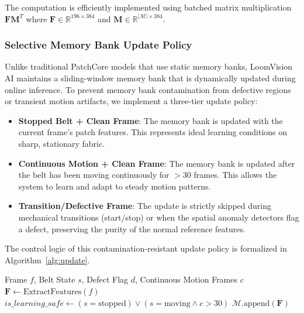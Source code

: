 \documentclass{ieeeaccess}
\begin{document}
The computation is efficiently implemented using batched matrix multiplication $\mathbf{F}\mathbf{M}^T$ where $\mathbf{F} \in \mathbb{R}^{196 \times 384}$ and $\mathbf{M} \in \mathbb{R}^{|\mathcal{M}| \times 384}$.

\subsubsection{Selective Memory Bank Update Policy}
Unlike traditional PatchCore models that use static memory banks, LoomVision AI maintains a sliding-window memory bank that is dynamically updated during online inference. To prevent memory bank contamination from defective regions or transient motion artifacts, we implement a three-tier update policy:
\begin{itemize}
    \item \textbf{Stopped Belt + Clean Frame}: The memory bank is updated with the current frame's patch features. This represents ideal learning conditions on sharp, stationary fabric.
    \item \textbf{Continuous Motion + Clean Frame}: The memory bank is updated after the belt has been moving continuously for $>30$ frames. This allows the system to learn and adapt to steady motion patterns.
    \item \textbf{Transition/Defective Frame}: The update is strictly skipped during mechanical transitions (start/stop) or when the spatial anomaly detectors flag a defect, preserving the purity of the normal reference features.
\end{itemize}
The control logic of this contamination-resistant update policy is formalized in Algorithm~\ref{alg:update}.

\begin{algorithm}
\caption{Selective Memory Bank Update Policy}
\label{alg:update}
\begin{algorithmic}[1]
\renewcommand{\algorithmicrequire}{\textbf{Input:}}
\REQUIRE Frame $f$, Belt State $s$, Defect Flag $d$, Continuous Motion Frames $c$
\STATE $\mathbf{F} \leftarrow \text{ExtractFeatures}(f)$
\STATE $is\_learning\_safe \leftarrow (s = \text{stopped}) \lor (s = \text{moving} \land c > 30)$
    \STATE $\mathcal{M}.\text{append}(\mathbf{F})$ 
\ELSE
    \STATE {} 
\ENDIF
\end{algorithmic}
\end{algorithm}
\end{document}
